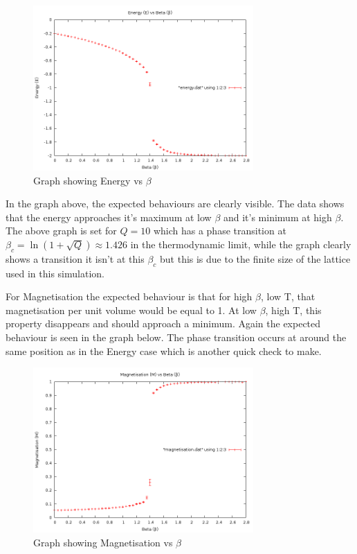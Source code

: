 \begin{figure}[H]
\centering
\includegraphics[width=0.75\textwidth]{4-Results/Q10EnergyBeta16x16RangeofBeta.png}
\caption{Graph showing Energy vs $\beta$}
\end{figure}

In the graph above, the expected behaviours are clearly visible. The data shows that the energy approaches it's maximum at low $\beta$ and it's minimum at high $\beta$. 
The above graph is set for $Q=10$ which has a phase transition at $\beta_c = \ln(1+\sqrt{Q}) \approx 1.426$ in the thermodynamic limit, while the graph clearly shows a transition it isn't at this $\beta_c$ but this is due to the finite size of the lattice used in this simulation.

For Magnetisation the expected behaviour is that for high $\beta$, low T, that magnetisation per unit volume would be equal to 1. At low $\beta$, high T, this property disappears and should approach a minimum. Again the expected behaviour is seen in the graph below. The phase transition occurs at around the same position as in the Energy case which is another quick check to make.

\begin{figure}[H]
\centering
\includegraphics[width=0.75\textwidth]{4-Results/Q10MagnetisationBeta16x16RangeofBeta.png}
\caption{Graph showing Magnetisation vs $\beta$}
\end{figure}

